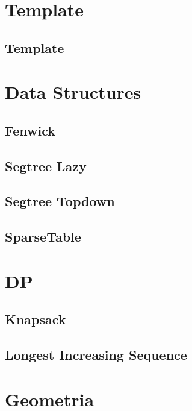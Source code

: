 \section{Template}
\subsection{Template}
\raggedbottom
\hrulefill

\section{Data Structures}
\subsection{Fenwick}
\raggedbottom
\hrulefill
\subsection{Segtree Lazy}
\raggedbottom
\hrulefill
\subsection{Segtree Topdown}
\raggedbottom
\hrulefill
\subsection{SparseTable}
\raggedbottom
\hrulefill

\section{DP}
\subsection{Knapsack}
\raggedbottom
\hrulefill
\subsection{Longest Increasing Sequence}
\raggedbottom
\hrulefill

\section{Geometria}
